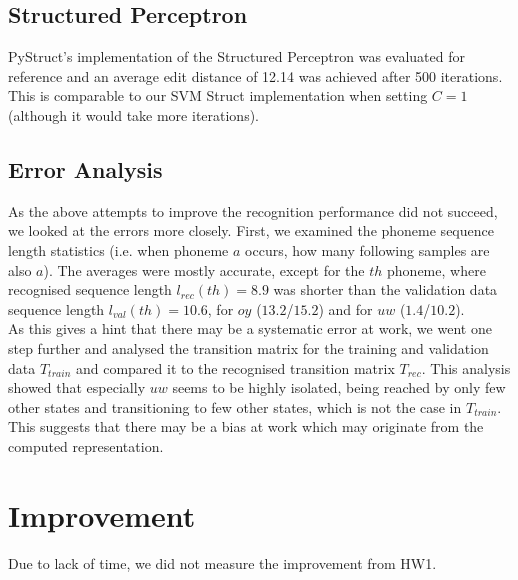 \documentclass[]{article}
\begin{document}
\subsection{Structured Perceptron}
PyStruct's implementation of the Structured Perceptron was evaluated for reference and an average edit distance of 12.14 was achieved after 500 iterations. This is comparable to our SVM Struct implementation when setting $C=1$ (although it would take more iterations). 
\subsection{Error Analysis}
As the above attempts to improve the recognition performance did not succeed, we looked at the errors more closely. First, we examined the phoneme sequence length statistics (i.e. when phoneme $a$ occurs, how many following samples are also $a$). The averages were mostly accurate, except for the $th$ phoneme, where recognised sequence length $l_{rec}(th)=8.9$ was shorter than the validation data sequence length $l_{val}(th)=10.6$, for $oy$ ($13.2$/$15.2$) and for $uw$ ($1.4$/$10.2$). \\
As this gives a hint that there may be a systematic error at work, we went one step further and analysed the transition matrix for the training and validation data $T_{train}$ and compared it to the recognised transition matrix $T_{rec}$. This analysis showed that especially $uw$ seems to be highly isolated, being reached by only few other states and transitioning to few other states, which is not the case in $T_{train}$.\\
This suggests that there may be a bias at work which may originate from the computed representation.
\section{Improvement}
Due to lack of time, we did not measure the improvement from HW1.
\end{document}
